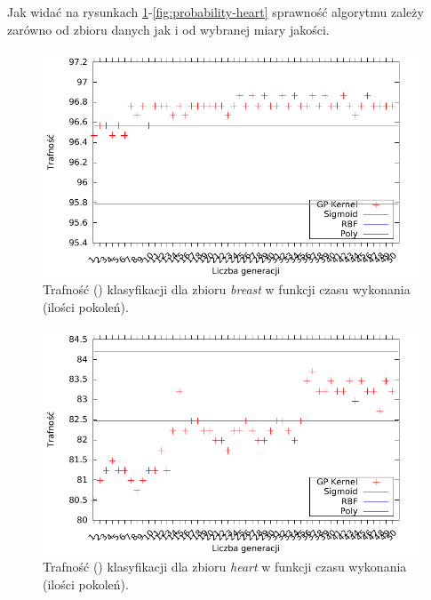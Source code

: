 	
	Jak widać na rysunkach \ref{fig:acc-breast}-\ref{fig:probability-heart} sprawność algorytmu zależy zarówno od zbioru danych jak i od wybranej miary jakości.
	
	\begin{figure}
		\includegraphics[scale=0.90]{figures/results/accuracy/accuracy-breast}
		\caption{Trafność () klasyfikacji dla zbioru \emph{breast} w funkcji czasu wykonania (ilości pokoleń).\label{fig:acc-breast}}
	\end{figure}
	
	\begin{figure}
		\includegraphics[scale=0.90]{figures/results/accuracy/accuracy-heart}
		\caption{Trafność () klasyfikacji dla zbioru \emph{heart} w funkcji czasu wykonania (ilości pokoleń).\label{fig:acc-heart}}
	\end{figure}
	
